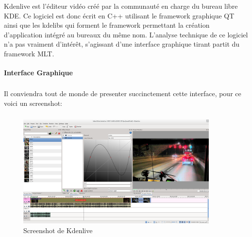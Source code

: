 Kdenlive est l'éditeur vidéo créé par la communauté en charge
du bureau libre KDE. Ce logiciel est donc écrit en C++ utilisant le
framework graphique QT  ainsi que les kdelibs qui forment le framework
permettant la création d'application intégré au bureaux du même nom.
L'analyse technique de ce logiciel n'a pas vraiment d'intérêt,
s'agissant d'une interface graphique tirant partit du framework MLT.

\paragraph {Interface Graphique}

\subparagraph{}

Il conviendra tout de monde de presenter succinctement cette interface,
pour ce voici un screenshot:

\subparagraph{}

\begin{figure}[H]

  \begin{center}

    \includegraphics[width=0.90\textwidth]{images/kdenlive}

  \end{center}

  \caption{Screenshot de Kdenlive}

  \label{Yes}

\end{figure}

